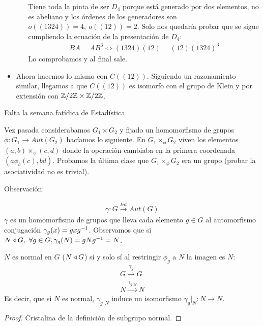 \begin{ej}
\begin{itemize}
\begin{itemize}
			Tiene toda la pinta de ser $D_4$ porque está generado por dos elementos, no es abeliano y los órdenes de los generadores son $o((1324)) = 4,\ o((12)) = 2$. Solo nos quedaría probar que se sigue cumpliendo la ecuación de la presentación de $D_4$:
			\begin{align*}
			BA = AB^3 \iff (1324)(12) = (12)(1324)^3
			\end{align*}
			Lo comprobamos y al final sale.
		\end{itemize}
		
		\item Ahora hacemos lo mismo con $C((12))$. Siguiendo un razonamiento similar, llegamos a que $C((12))$ es isomorfo con el grupo de Klein y por extensión con $\mathbb{Z}/2\mathbb{Z} \times \mathbb{Z}/2\mathbb{Z}$.
	\end{itemize}
\end{ej}


Falta la semana fatídica de Estadística

Vez pasada considerabamos $G_1 \times G_2$ y fijado un homomorfismo de grupos $\phi: G_1 \to Aut(G_2)$ hacíamos lo siguiente. En $G_1 \times_{\phi} G_2$ viven los elementos $(a,b) \times_{\phi} (c,d)$ donde la operación cambiaba en la primera coordenada $(a \phi_b(c), bd)$. Probamos la última clase que $G_1 \times_{\phi} G_2$ era un grupo (probar la asociatividad no es trivial).


Observación:

\begin{align*}
\gamma: G \xrightarrow{Int} Aut(G)
\end{align*}
$\gamma$ es un homomorfismo de grupos que lleva cada elemento $g \in G$ al automorfismo conjugación $\gamma_g(x) = gxg^{-1}$. Observamos que si $N \mathbin{\triangleleft} G,\ \forall g \in G, \gamma_g(N) = gNg^{-1} = N$.

\begin{pro}
	$N$ es normal en $G$ ($N \mathbin{\triangleleft} G$) sí y solo sí al restringir $\phi_g$ a $N$ la imagen es $N$:
	\begin{align*}
	G \xrightarrow{\gamma_g} G \\
	N \xrightarrow{\gamma_g \vert_N} N
	\end{align*}
	Es decir, que si $N$ es normal, $\gamma_g\vert_N$ induce un isomorfismo $\gamma_g\vert_N : N \to N$.
\end{pro}

\begin{proof}
	Cristalina de la definición de subgrupo normal.
\end{proof}

